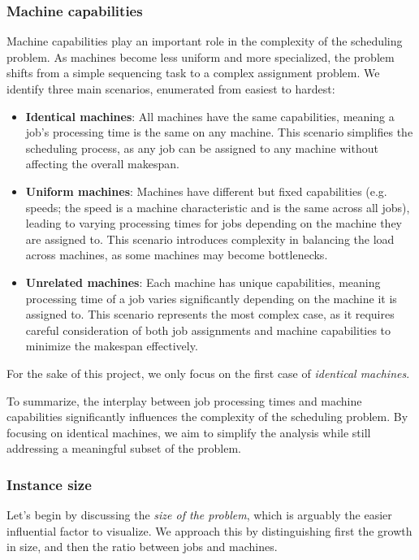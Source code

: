 \subsubsection{Machine capabilities}
Machine capabilities play an important role in the complexity of the scheduling problem.
As machines become less uniform and more specialized, the problem shifts from a simple sequencing task to a complex assignment problem.
We identify three main scenarios, enumerated from easiest to hardest:
\begin{itemize}
  \item \textbf{Identical machines}: All machines have the same capabilities, meaning a job's processing time is the same on any machine.
  This scenario simplifies the scheduling process, as any job can be assigned to any machine without affecting the overall makespan.
  \item \textbf{Uniform machines}: Machines have different but fixed capabilities (e.g. speeds; the speed is a machine characteristic and is the same across all jobs), leading to varying processing times for jobs depending on the machine they are assigned to.
  This scenario introduces complexity in balancing the load across machines, as some machines may become bottlenecks.
  \item \textbf{Unrelated machines}: Each machine has unique capabilities, meaning processing time of a job varies significantly depending on the machine it is assigned to.
  This scenario represents the most complex case, as it requires careful consideration of both job assignments and machine capabilities to minimize the makespan effectively.
\end{itemize}

For the sake of this project, we only focus on the first case of \emph{identical machines}.

To summarize, the interplay between job processing times and machine capabilities significantly influences the complexity of the scheduling problem.
By focusing on identical machines, we aim to simplify the analysis while still addressing a meaningful subset of the problem.


\subsubsection{Instance size}
Let's begin by discussing the \emph{size of the problem}, which is arguably the easier influential factor to visualize.
We approach this by distinguishing first the growth in size, and then the ratio between jobs and machines.

